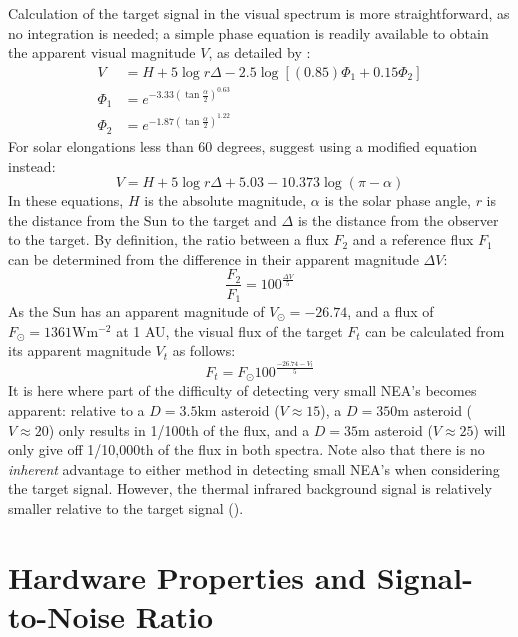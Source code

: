 Calculation of the target signal in the visual spectrum is more straightforward, as no integration is needed; a simple phase equation is readily available to obtain the apparent visual magnitude $V$, as detailed by \cite{2003NEOSDT}:
\begin{align}
 V &= H + 5 \log r \Delta - 2.5 \log \left[ (0.85) \Phi_1 + 0.15 \Phi_2 \right] \\
 \Phi_1 &= e^{-3.33\left(\tan \frac{\alpha}{2} \right)^{0.63}} \\
 \Phi_2 &= e^{-1.87\left(\tan \frac{\alpha}{2} \right)^{1.22}}
\end{align}
For solar elongations less than 60 degrees, \cite{2003NEOSDT} suggest using a modified equation instead:
\begin{equation}
 V = H + 5 \log r \Delta + 5.03 - 10.373 \log (\pi - \alpha)
\end{equation}
In these equations, $H$ is the absolute magnitude, $\alpha$ is the solar phase angle, $r$ is the distance from the Sun to the target and $\Delta$ is the distance from the observer to the target. By definition, the ratio between a flux $F_2$ and a reference flux $F_1$ can be determined from the difference in their apparent magnitude $\Delta V$:
\begin{equation}
 \frac{F_2}{F_1} = 100^{\frac{\Delta V}{5}}
\end{equation}
As the Sun has an apparent magnitude of $V_\odot = -26.74$, and a flux of $F_\odot = 1361 \mathrm{W}\mathrm{m}^{-2}$ at 1 AU, the visual flux of the target $F_t$ can be calculated from its apparent magnitude $V_t$ as follows:
\begin{equation}
 F_t = F_\odot 100^{\frac{-26.74 - V_t}{5}}
\end{equation}
It is here where part of the difficulty of detecting very small NEA's becomes apparent: relative to a $D = 3.5 \mathrm{km}$ asteroid ($V \approx 15$), a $D = 350 \mathrm{m}$ asteroid ($V \approx 20$) only results in 1/100th of the flux, and a $D = 35 \mathrm{m}$ asteroid ($V \approx 25$) will only give off 1/10,000th of the flux in both spectra. Note also that there is no \textit{inherent} advantage to either method in detecting small NEA's when considering the target signal. However, the thermal infrared background signal is relatively smaller relative to the target signal (\cite{2003NEOSDT}).

\section{Hardware Properties and Signal-to-Noise Ratio}
\label{sec:modelling_hardware_SNR}

